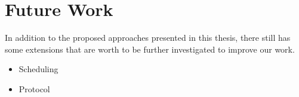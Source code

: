 \section{Future Work}
In addition to the proposed approaches presented in this thesis, there still has some extensions that are worth to be further investigated to improve our work.
\begin{itemize}
\item Scheduling
\item Protocol
\end{itemize}